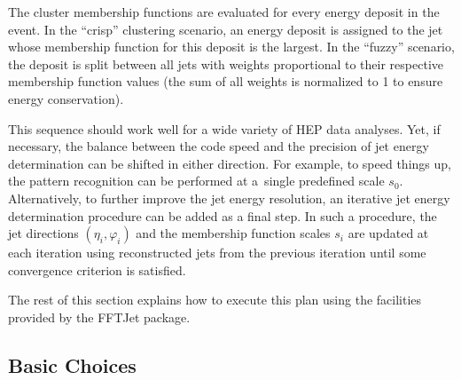 \documentclass[epsf,12pt,titlepage]{article}
\begin{document}
\begin{enumerate}
      The cluster membership functions
      are evaluated for every energy deposit in the event.
      In the ``crisp'' clustering scenario, an energy deposit is assigned to the jet
      whose membership function for this deposit is the largest. In the ``fuzzy''
      scenario, the deposit is split between all jets with weights
      proportional to their respective membership function values
      (the sum of all weights is normalized to 1 to ensure energy conservation).
\end{enumerate}
This sequence should work well for a wide variety of HEP data analyses.
Yet, if necessary, the balance between the code speed and the precision
of jet energy determination can be shifted in either direction.
For example, to speed things
up, the pattern recognition can be performed at a~single
predefined scale $s_0$. Alternatively, to further improve the jet energy
resolution, an iterative jet energy determination procedure can be
added as a final step. In such a procedure,
the jet directions $(\eta_i, \varphi_i)$
and the membership function scales $s_i$ are
updated at each iteration using
reconstructed jets from the previous iteration until
some convergence criterion is satisfied.

The rest of this section explains how to execute this plan
using the facilities provided by the FFTJet package.


\subsection{Basic Choices}
\label{basicchoice}
\end{document}
